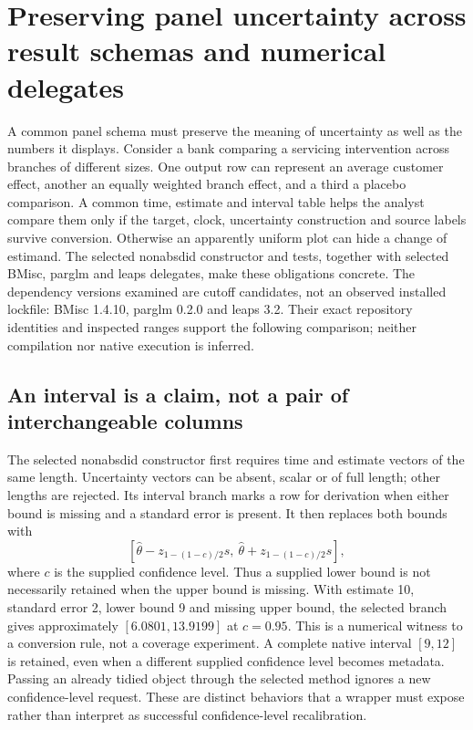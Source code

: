 \section{Preserving panel uncertainty across result schemas and numerical delegates}
\label{sec:exec29-panel-inference-contracts}

A common panel schema must preserve the meaning of uncertainty as well as the numbers it displays. Consider a bank comparing a servicing intervention across branches of different sizes. One output row can represent an average customer effect, another an equally weighted branch effect, and a third a placebo comparison. A common time, estimate and interval table helps the analyst compare them only if the target, clock, uncertainty construction and source labels survive conversion. Otherwise an apparently uniform plot can hide a change of estimand. The selected nonabsdid constructor and tests, together with selected BMisc, parglm and leaps delegates, make these obligations concrete. The dependency versions examined are cutoff candidates, not an observed installed lockfile: BMisc 1.4.10, parglm 0.2.0 and leaps 3.2. Their exact repository identities and inspected ranges support the following comparison; neither compilation nor native execution is inferred.\citep{exec29_panel_inference_sources}

\subsection{An interval is a claim, not a pair of interchangeable columns}

The selected nonabsdid constructor first requires time and estimate vectors of the same length. Uncertainty vectors can be absent, scalar or of full length; other lengths are rejected. Its interval branch marks a row for derivation when either bound is missing and a standard error is present. It then replaces both bounds with
\[
 [\widehat\theta-z_{1-(1-c)/2}s,\ \widehat\theta+z_{1-(1-c)/2}s],
\]
where $c$ is the supplied confidence level. Thus a supplied lower bound is not necessarily retained when the upper bound is missing. With estimate 10, standard error 2, lower bound 9 and missing upper bound, the selected branch gives approximately $[6.0801,13.9199]$ at $c=0.95$. This is a numerical witness to a conversion rule, not a coverage experiment. A complete native interval $[9,12]$ is retained, even when a different supplied confidence level becomes metadata. Passing an already tidied object through the selected method ignores a new confidence-level request. These are distinct behaviors that a wrapper must expose rather than interpret as successful confidence-level recalibration.\citep{exec29_panel_inference_sources,exec29_panel_inference_reference}

